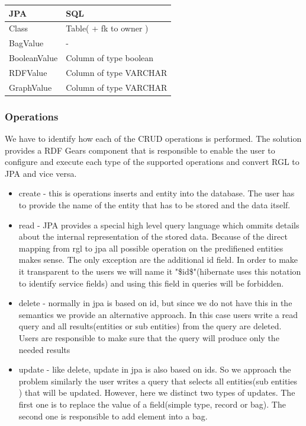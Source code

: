 \documentclass[a4paper, notitlepage]{article}
\begin{document}
\begin{center}
    \begin{tabular}{ | l | l |}
    \hline
    JPA & SQL  \\ \hline
    Class & Table( + fk to owner ) \\ \hline
    BagValue & -  \\ \hline
    BooleanValue & Column of type boolean  \\ \hline
    RDFValue & Column of type VARCHAR  \\ \hline
	GraphValue & Column of type VARCHAR  \\ \hline
    \end{tabular}
\end{center}

\subsubsection{Operations}
We have to identify how each of the CRUD operations is performed. The solution provides a RDF Gears component that is responsible to enable the user to configure and execute each type of the supported operations and convert RGL to JPA and vice versa.
\begin{itemize}
	\item create - this is operations inserts and entity into the database. The user has to provide the name of the entity that has to be stored and the data itself.
	\item read - JPA provides a special high level query language which ommits details about the internal representation of the stored data. Because of the direct mapping from rgl to jpa all possible operation on the predifiened entities makes sense. The only exception are the additional id field. In order to make it transparent to the users we will name it "\$id\$"(hibernate uses this notation to identify service fields) and using this field in queries will be forbidden.
	\item delete - normally in jpa is based on id, but since we do not have this in the semantics we provide an alternative approach. In this case users write a read query and all results(entities or sub entities) from the query are deleted. Users are responsible to make sure that the query will produce only the needed results
	\item update - like delete, update in jpa is also based on ids. So we approach the problem similarly the user writes a query that selects all entities(sub entities ) that will be updated. However, here we distinct two types of updates. The first one is to replace the value of a field(simple type, record or bag). The second one is responsible to add element into a bag.
\end{itemize}
\end{document}
